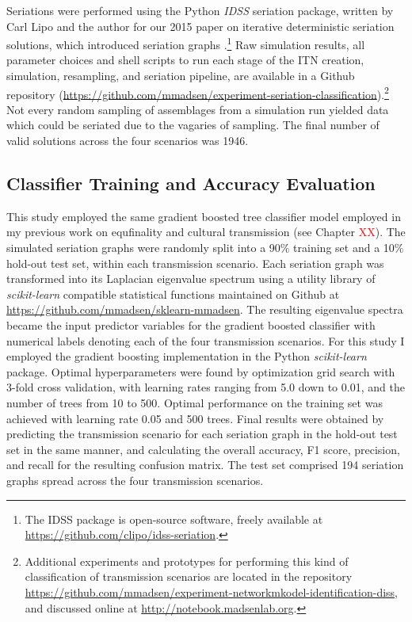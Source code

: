     Seriations were performed using the Python \emph{IDSS} seriation package, written by Carl Lipo and the author for our 2015 paper on iterative deterministic seriation solutions, which introduced seriation graphs \citep{Lipo2015}.\footnote{The IDSS package is open-source software, freely available at \url{https://github.com/clipo/idss-seriation}.}  Raw simulation results, all parameter choices and shell scripts to run each stage of the ITN creation, simulation, resampling, and seriation pipeline, are available in a Github repository (\url{https://github.com/mmadsen/experiment-seriation-classification}).\footnote{Additional experiments and prototypes for performing this kind of classification of transmission scenarios are located in the repository \url{https://github.com/mmadsen/experiment-networkmkodel-identification-diss}, and discussed online at \url{http://notebook.madsenlab.org}.}  Not every random sampling of assemblages from a simulation run yielded data which could be seriated due to the vagaries of sampling.  The final number of valid solutions across the four scenarios was 1946.
    
    \subsection{Classifier Training and Accuracy Evaluation}\label{metapop:sec:classifier}
    
    This study employed the same gradient boosted tree classifier model employed in my previous work on equfinality and cultural transmission (see Chapter \textcolor{red}{XX}).  The simulated seriation graphs were randomly split into a 90\% training set and a 10\% hold-out test set, within each transmission scenario.  Each seriation graph was transformed into its Laplacian eigenvalue spectrum using a utility library of \emph{scikit-learn} compatible statistical functions maintained on Github at \url{https://github.com/mmadsen/sklearn-mmadsen}.  The resulting eigenvalue spectra became the input predictor variables for the gradient boosted classifier with numerical labels denoting each of the four transmission scenarios.  
    For this study I employed the gradient boosting implementation in the Python \emph{scikit-learn} package.  Optimal hyperparameters were found by optimization grid search with 3-fold cross validation, with learning rates ranging from 5.0 down to 0.01, and the number of trees from 10 to 500.  Optimal performance on the training set was achieved with learning rate 0.05 and 500 trees.  Final results were obtained by predicting the transmission scenario for each seriation graph in the hold-out test set in the same manner, and calculating the overall accuracy, F1 score, precision, and recall for the resulting confusion matrix.   The test set comprised 194 seriation graphs spread across the four transmission scenarios.
    
